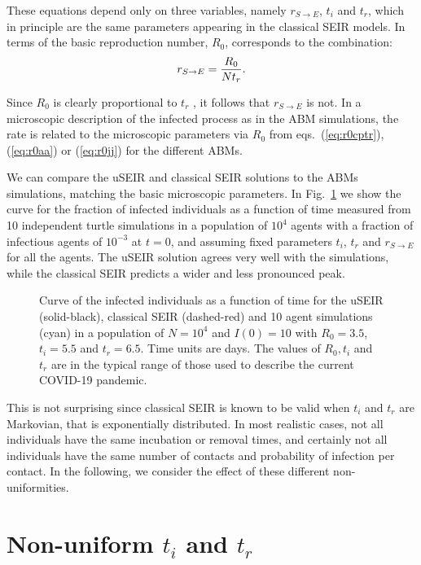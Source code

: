 \documentclass[a4paper,oneside,11pt]{article}
\begin{document}
These equations depend only on three variables, namely $r_{S\rightarrow E}$, $t_i$ and $t_r$, which in principle are the same parameters appearing in the classical SEIR models. In terms of the 
basic reproduction number, $R_0$,  corresponds to the combination:
\begin{eqnarray}
r_{S\rightarrow E} = {R_0\over N t_r}.
\end{eqnarray}

Since $R_0$ is clearly proportional to $t_r$ , it follows that $r_{S\rightarrow E}$ is not. In a microscopic description of the infected process as in the ABM simulations, the rate is related to the microscopic parameters via $R_0$ from eqs.~(\ref{eq:r0cptr}), (\ref{eq:r0aa}) or (\ref{eq:r0jj}) for the different ABMs.

  We can compare the uSEIR and classical SEIR solutions to the ABMs simulations, matching the basic microscopic parameters. 
In Fig.~\ref{fig:fixed} we show the curve for the fraction of infected individuals as a function of time measured from 10 independent turtle simulations in a population of $10^4$ agents with a fraction of infectious agents of $10^{-3}$ at $t=0$, and assuming fixed parameters $t_i$, $t_r$ and $r_{S\rightarrow E}$ for all the agents. The uSEIR solution agrees very well with the simulations, while the classical SEIR predicts a wider and less pronounced peak.

\begin{figure}[h!]
  \centering
  \caption{ Curve of the infected individuals as a function of time for the uSEIR (solid-black), classical SEIR (dashed-red) and 10 agent simulations (cyan) in a  population of $N=10^4$ and $I(0)=10$ with $R_0=3.5$, $t_i=5.5$ and $t_r=6.5$. Time units are days. The values of $R_0, t_i$ and $t_r$ are in the typical range of those used to describe the
  current COVID-19 pandemic. }
  \label{fig:fixed}
   \end{figure}

  This is not surprising since classical SEIR is known to be valid when  $t_i$ and $t_r$ are Markovian, that is  exponentially distributed. In most realistic cases, not all individuals have the same incubation or removal times, and certainly not all individuals have the same number of contacts and probability of infection per contact. In the following, we consider the effect of these different non-uniformities.

\section{Non-uniform $t_i$ and $t_r$ }
\label{sec:titr}
\end{document}
